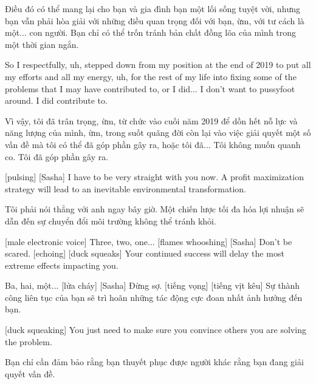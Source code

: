 \documentclass[a4paper]{article}
\begin{document}
	\begin{vietnamese-v2}
		Điều đó có thể mang lại cho bạn và gia đình bạn một lối sống tuyệt vời, nhưng bạn vẫn phải hòa giải với những điều quan trọng đối với bạn, ừm, với tư cách là một... con người.
		Bạn chỉ có thể trốn tránh bản chất đồng lõa của mình trong một thời gian ngắn.
	\end{vietnamese-v2}
	
	
	So I respectfully, uh, stepped down from my position at the end of 2019 to put all my efforts and all my energy, uh, for the rest of my life into fixing some of the problems that I may have contributed to, or I did...
	I don't want to pussyfoot around. I did contribute to.
	
	\begin{vietnamese-v2}
		Vì vậy, tôi đã trân trọng, ừm, từ chức vào cuối năm 2019 để dồn hết nỗ lực và năng lượng của mình, ừm, trong suốt quãng đời còn lại vào việc giải quyết một số vấn đề mà tôi có thể đã góp phần gây ra, hoặc tôi đã...
		Tôi không muốn quanh co. Tôi đã góp phần gây ra.
	\end{vietnamese-v2}
	
	[pulsing]
	[Sasha] I have to be very straight with you now.
	A profit maximization strategy will lead to an inevitable environmental transformation.
	
	\begin{vietnamese-v2}
		 Tôi phải nói thẳng với anh ngay bây giờ.
		Một chiến lược tối đa hóa lợi nhuận sẽ dẫn đến sự chuyển đổi môi trường không thể tránh khỏi.
	\end{vietnamese-v2}
	
	
	[male electronic voice] Three, two, one...
	[flames whooshing]
	[Sasha] Don't be scared. [echoing]
	[duck squeaks]
	Your continued success will delay the most extreme effects impacting you.
	
	\begin{vietnamese-v2}
		 Ba, hai, một...
		[lửa cháy]
		[Sasha] Đừng sợ. [tiếng vọng]
		[tiếng vịt kêu]
		Sự thành công liên tục của bạn sẽ trì hoãn những tác động cực đoan nhất ảnh hưởng đến bạn.
	\end{vietnamese-v2}
	
	[duck squeaking]
	You just need to make sure you convince others you are solving the problem.
	
	\begin{vietnamese-v2}
		Bạn chỉ cần đảm bảo rằng bạn thuyết phục được người khác rằng bạn đang giải quyết vấn đề.
	\end{vietnamese-v2}
	
\end{document}
